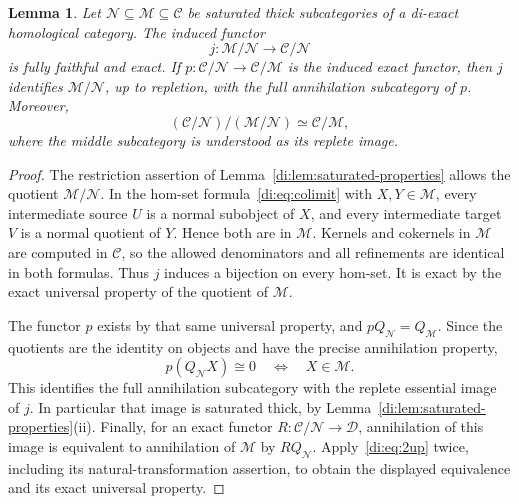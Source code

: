\documentclass[11pt,reqno,a4paper]{amsart}
\newtheorem{lemma}[theorem]{Lemma}
\theoremstyle{definition}
\theoremstyle{remark}
\newcommand{\C}{\mathcal{C}}
\newcommand{\D}{\mathcal{D}}
\newcommand{\M}{\mathcal{M}}
\newcommand{\N}{\mathcal{N}}
\newcommand{\0}{\mathbf{0}}
\renewcommand{\1}{\mathbf{1}}
\begin{document}
\begin{lemma}\label{di:lem:nested}
Let $\N\subseteq\M\subseteq\C$ be saturated thick subcategories of a di-exact homological category. The induced functor
\[
 j:\M/\N\longrightarrow\C/\N
\]
is fully faithful and exact. If $p:\C/\N\to\C/\M$ is the induced exact functor, then $j$ identifies $\M/\N$, up to repletion, with the full annihilation subcategory of $p$. Moreover,
\[
 (\C/\N)/(\M/\N)\simeq\C/\M,
\]
where the middle subcategory is understood as its replete image.
\end{lemma}
\begin{proof}
The restriction assertion of Lemma~\ref{di:lem:saturated-properties} allows the quotient $\M/\N$. In the hom-set formula~\eqref{di:eq:colimit} with $X,Y\in\M$, every intermediate source $U$ is a normal subobject of $X$, and every intermediate target $V$ is a normal quotient of $Y$. Hence both are in $\M$. Kernels and cokernels in $\M$ are computed in $\C$, so the allowed denominators and all refinements are identical in both formulas. Thus $j$ induces a bijection on every hom-set. It is exact by the exact universal property of the quotient of $\M$.

The functor $p$ exists by that same universal property, and $pQ_{\N}=Q_{\M}$. Since the quotients are the identity on objects and have the precise annihilation property,
\[
 p(Q_{\N}X)\cong0\quad\Longleftrightarrow\quad X\in\M.
\]
This identifies the full annihilation subcategory with the replete essential image of $j$. In particular that image is saturated thick, by Lemma~\ref{di:lem:saturated-properties}(ii). Finally, for an exact functor $R:\C/\N\to\D$, annihilation of this image is equivalent to annihilation of $\M$ by $RQ_{\N}$. Apply~\eqref{di:eq:2up} twice, including its natural-transformation assertion, to obtain the displayed equivalence and its exact universal property.
\end{proof}
\end{document}
